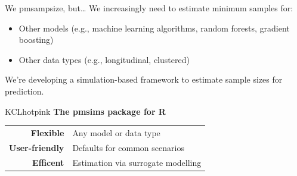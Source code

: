 \documentclass[11pt]{beamer}
\newcommand*{\colitem}[2]{%
    \item[\textcolor{#1}{\textbullet}] \textcolor{#1}{#2}
}
\newcommand{\sgap}{\vspace{0.5em}}
\newcommand{\bgap}{\vspace{0.8em}}
\newcommand*{\img}[1]{%
    \raisebox{-.3\baselineskip}{%
        \texttt{[image: \#1]}%
    }%
}
\begin{document}
\begin{frame}[t]{We \img{figures/heart.png} pmsampsize, but\ldots}
	\large
	\vspace{1em}
	We increasingly need to estimate minimum samples for:\ \sgap
	\begin{itemize}
		\colitem{KCLpurple}{Other models (e.g., machine learning algorithms, random
			forests, gradient boosting)}
		\colitem{KCLseablue}{Other data types (e.g., longitudinal, clustered)}
	\end{itemize}

	\vspace{1.5em}
	We're developing a simulation-based framework to estimate sample
	sizes for prediction.

	\begin{cbox}[colframe=KCLhotpink!50!black]{KCLhotpink}{}
		\RaggedRight
		{\Large \textbf{The pmsims package for R}}

        \bgap

		\begin{tabular}{rp{}}
			\textbf{Flexible}      & Any model or data type             \\
			\textbf{User-friendly} & Defaults for common scenarios      \\
			\textbf{Efficent}      & Estimation via surrogate modelling
		\end{tabular}
	\end{cbox}

\end{frame}
\end{document}
